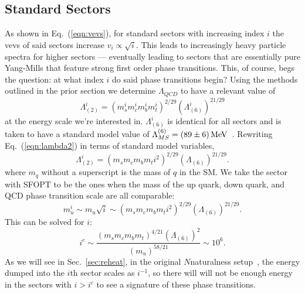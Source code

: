 \documentclass[nofootinbib,twocolumn,preprintnumbers]{revtex4-1}
\begin{document}
\subsection{Standard Sectors}
As shown in Eq.~(\ref{eqn:vevs}), for standard sectors with increasing index $i$ the vevs of said sectors increase $v_i\propto \sqrt{i}$. This leads to increasingly heavy particle spectra for higher sectors --- eventually leading to sectors that are essentially pure Yang-Mills that feature strong first order phase transitions. This, of course, begs the question: at what index $i$ do said phase transitions begin?
Using the methods outlined in the prior section we determine $\Lambda_{QCD}$ to have a relevant value of 
\begin{equation}\label{eqn:lambda2}
\Lambda^i_{(2)} = (m_s^i m_c^i m_b^i m_t^i)^{2/29}(\Lambda^i_{(6)})^{21/29}
\end{equation} 
at the energy scale we're interested in. $\Lambda^i_{(6)}$ is identical for all sectors and is taken to have a standard model value of $\Lambda^{(6)}_{MS} =(89 \pm 6)\, {\rm MeV}$~\cite{PhysRevD.98.030001}. Rewriting Eq.~(\ref{eqn:lambda2}) in terms of standard model variables, 
\begin{equation}\label{eqn:lambda2adj}
\Lambda^i_{(2)} = (m_s m_c m_b m_t i^2)^{2/29}(\Lambda_{(6)})^{21/29}.
\end{equation}
where $m_q$ without a superscript is the mass of $q$ in the SM. We take the sector with SFOPT to be the ones when the mass of the up quark, down quark, and QCD phase transition scale are all comparable:
\begin{equation}
m^i_u \sim m_u \sqrt{i} \sim (m_s m_c m_b m_t i^2)^{2/29}(\Lambda_{(6)})^{21/29}.
\end{equation}
This can be solved for $i$:
\begin{equation}\label{eqn:critIndex}
i^c \sim \frac{(m_s m_c m_b m_t)^{4/21}(\Lambda_{(6)})^{2}}{( m_u)^{58/21}} \sim 10^6.
\end{equation}
As we will see in Sec.~\ref{sec:reheat}, in the original $N$naturalness setup~\cite{Arkani-Hamed:2016rle}, the energy dumped into the $i$th sector scales as $i^{-1}$, so there will will not be enough energy in the sectors with $i>i^c$ to see a signature of these phase transitions. 
\end{document}
